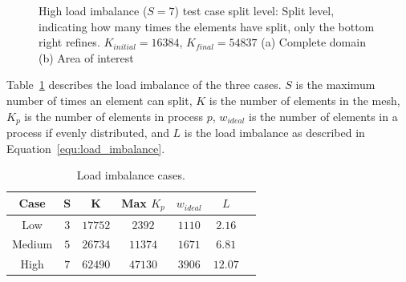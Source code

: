 \begin{figure}[H]
	\centering
	\hfill
	\caption{High load imbalance (\(S = 7\)) test case split level: Split level, indicating how many times the elements have split, only the bottom right refines. \(K_{initial} = 16384\), \(K_{final} = 54837\) (a) Complete domain (b) Area of interest}\label{fig:load_imbalance_case_high_s}
\end{figure}

Table~\ref{table:load_imbalance} describes the load imbalance of the three cases. \(S\) is the
maximum number of times an element can split, \(K\) is the number of elements in the mesh, \(K_p\)
is the number of elements in process \(p\), \(w_{ideal}\) is the number of elements in a process if
evenly distributed, and \(L\) is the load imbalance as described in
Equation~\ref{equ:load_imbalance}.

\begin{table}[H]
	\centering
	\begin{tabular}{ c c c c c c c }
		Case & S & K & Max \(K_p\) & \(w_{ideal}\) & \(L\) \\
		\midrule
		Low & \(3\) & \(17752\) & \(2392\) & \(1110\) & \(2.16\) \\
		Medium & \(5\) & \(26734\) & \(11374\) & \(1671\) & \(6.81\) \\
		High & \(7\) & \(62490\) & \(47130\) & \(3906\) & \(12.07\) \\
	\end{tabular}
	\caption{Load imbalance cases.}\label{table:load_imbalance}
\end{table}

